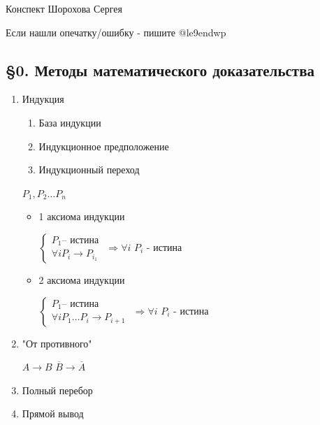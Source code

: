 \documentclass[14pt, letter paper]{article}
\begin{document}
\begin{flushright}
    Конспект Шорохова Сергея

    Если нашли опечатку/ошибку - пишите @le9endwp
\end{flushright}

\begin{center}
    \subsection*{\S 0. Методы математического доказательства}
\end{center}

\begin{enumerate}
    \item Индукция

    \begin{enumerate}
        \item База индукции
        \item Индукционное предположение
        \item Индукционный переход
    \end{enumerate}

    $P_1, P_2 \ldots P_n$

    \begin{itemize}
        \item 1 аксиома индукции

        $\begin{cases}
            P_1 \text{-- истина} \\
            \forall i P_i \rightarrow P_{i_1}
        \end{cases}$
        $\Rightarrow \forall i$ $P_i$ - истина

        \item 2 аксиома индукции

        $\begin{cases}
            P_1 \text{-- истина} \\
            \forall i P_1 \ldots P_i \rightarrow P_{i+1}
        \end{cases}$
        $\Rightarrow \forall i$ $P_i$ - истина
    \end{itemize}
    \item "От противного"

    $A \rightarrow B$ $\overline{B} \rightarrow \overline{A}$

    \item Полный перебор

    \item Прямой вывод


\end{enumerate}
\end{document}
